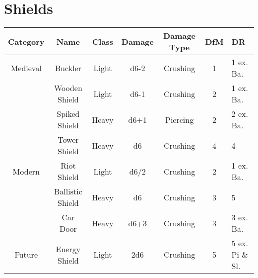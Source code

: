 \section{Shields} \label{sec:shields}
\begin{center}
    \begin{tabular}{c|c|c|c|c|c|l}
        \textbf{Category} & \textbf{Name} & \textbf{Class} & \textbf{Damage} & \textbf{Damage Type} & \textbf{DfM} & \textbf{DR} \\\hline
        Medieval & Buckler          & Light & d6-2 & Crushing & 1 & 1 ex. Ba.\\
                 & Wooden Shield    & Light & d6-1 & Crushing & 2 & 1 ex. Ba.\\
                 & Spiked Shield    & Heavy & d6+1 & Piercing & 2 & 2 ex. Ba.\\
                 & Tower Shield     & Heavy & d6   & Crushing & 4 & 4\\\hline
        Modern   & Riot Shield      & Light & d6/2 & Crushing & 2 & 1 ex. Ba.\\
                 & Ballistic Shield & Heavy & d6   & Crushing & 3 & 5\\
                 & Car Door         & Heavy & d6+3 & Crushing & 3 & 3 ex. Ba.\\\hline
        Future   & Energy Shield    & Light & 2d6  & Crushing & 5 & 5 ex. Pi \& Sl.
    \end{tabular}
\end{center}


